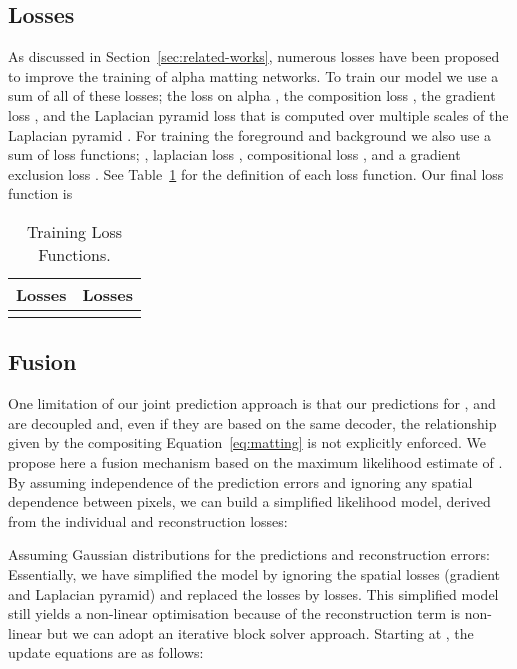 \documentclass[runningheads]{llncs}
\begin{document}
\subsection{ Losses} 

As discussed in Section~\ref{sec:related-works}, numerous losses have been proposed to improve the training of alpha matting networks. To train our model we use a sum
of all of these losses; the  loss on alpha , the composition loss , the gradient
loss , and the Laplacian pyramid loss that is computed over 
multiple scales  of the Laplacian pyramid . For training the foreground and background we also use a sum of loss functions; , laplacian loss , compositional loss , and a gradient exclusion loss . See Table~\ref{tab:losses} for the definition of each loss function. 
Our final loss function is 



\begin{table}[t]
\centering
  \caption{Training Loss Functions. }
\label{tab:losses}
\begin{tabular}{ll}
\toprule
 Losses  &  Losses         \\
\midrule
\begin{minipage}{.5\linewidth}
  
\end{minipage}
&
\begin{minipage}{.5\linewidth}
   
\end{minipage} \\
 \bottomrule
\end{tabular}
\end{table}
                

\subsection{ Fusion}

One limitation of our joint prediction approach is that our predictions for
,  and  are decoupled and, even if they are based on the same
decoder, the relationship given by the compositing Equation~\ref{eq:matting} is
not explicitly enforced. We propose here a fusion mechanism based on the maximum
likelihood estimate of . By
assuming independence of the prediction errors and ignoring any spatial
dependence between pixels, we can build a simplified likelihood model, derived
from the individual and reconstruction losses:

Assuming Gaussian distributions for the predictions and reconstruction errors:
{ \small
}
Essentially, we have simplified the model by ignoring the spatial losses
(gradient and Laplacian pyramid) and replaced the  losses by  losses.
This simplified model still yields a non-linear optimisation because of the
reconstruction term is non-linear but we can adopt an iterative block solver
approach.  Starting at , the
update equations are as follows:
\end{document}
